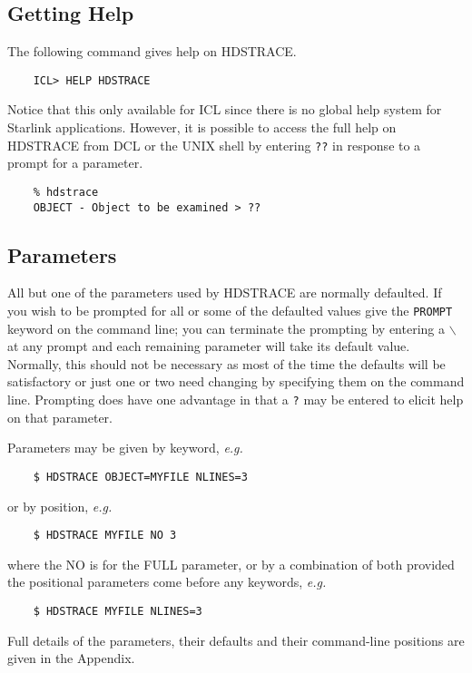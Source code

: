 \subsection{Getting Help}
The following command gives help on HDSTRACE.
\small
\begin{verbatim}
    ICL> HELP HDSTRACE
\end{verbatim}
\normalsize
Notice that this only available for ICL since there is no global help 
system for Starlink applications.  However, it is possible to access
the full help on {\footnotesize HDSTRACE} from DCL or the UNIX shell by
entering {\tt ??} in response to a prompt for a parameter.

\small
\begin{verbatim}
    % hdstrace
    OBJECT - Object to be examined > ??
\end{verbatim}
\normalsize
\subsection{Parameters}
All but one of the parameters used by {\footnotesize HDSTRACE} are
normally defaulted.  If you wish to be prompted for all or some of the
defaulted values give the {\tt PROMPT} keyword on the command line; you
can terminate the prompting by entering a {\tt $\backslash$} at any
prompt and each remaining parameter will take its default value.
Normally, this should not be necessary as most of the time the defaults
will be satisfactory or just one or two need changing by specifying them
on the command line. Prompting does have one advantage in that a {\tt ?}
may be entered to elicit help on that parameter. 

Parameters may be given by keyword, {\it e.g.}\
\small
\begin{verbatim}
    $ HDSTRACE OBJECT=MYFILE NLINES=3
\end{verbatim}
\normalsize
or by position, {\it e.g.}\

\small
\begin{verbatim}
    $ HDSTRACE MYFILE NO 3
\end{verbatim}
\normalsize
where the NO is for the FULL parameter, or by a combination of both
provided the positional parameters come before any keywords, {\it e.g.}\

\small
\begin{verbatim}
    $ HDSTRACE MYFILE NLINES=3
\end{verbatim}
\normalsize
Full details of the parameters, their defaults and their command-line
positions are given in the Appendix.

